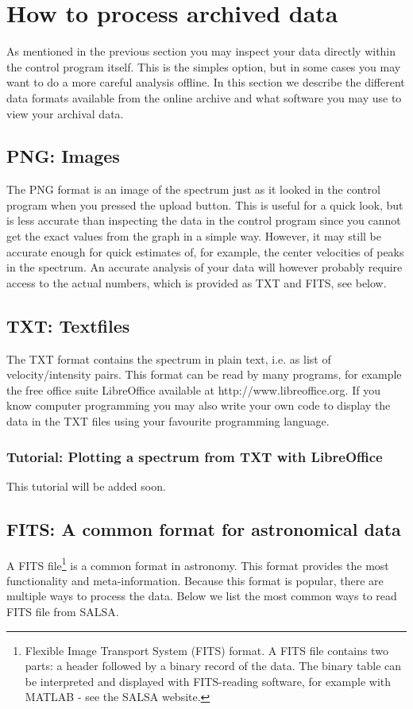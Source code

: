 \section{How to process archived data}
\label{sect:archiveprocess}
As mentioned in the previous section you may inspect your data directly within
the control program itself. This is the simples option, but in some cases you
may want to do a more careful analysis offline. In this section we describe the
different data formats available from the online archive and what software you
may use to view your archival data. 

\subsection{PNG: Images}
The PNG format is an image of the spectrum just as it looked in the control
program when you pressed the upload button. This is useful for a quick look,
but is less accurate than inspecting the data in the control program since you
cannot get the exact values from the graph in a simple way. However, it may
still be accurate enough for quick estimates of, for example, the center
velocities of peaks in the spectrum. An accurate analysis of your data will
however probably require access to the actual numbers, which is provided
as TXT and FITS, see below.

\subsection{TXT: Textfiles}
The TXT format contains the spectrum in plain text, i.e. as list of
velocity/intensity pairs. This format can be read by many programs, for example
the free office suite LibreOffice available at http://www.libreoffice.org.  If
you know computer programming you may also write your own code to display the
data in the TXT files using your favourite programming language.
\subsubsection{Tutorial: Plotting a spectrum from TXT with LibreOffice}
This tutorial will be added soon.

\subsection{FITS: A common format for astronomical data}
A FITS file\footnote{Flexible Image Transport System (FITS) format.  A FITS
file contains two parts: a header followed by a binary record of the data.  The
binary table can be interpreted and displayed with FITS-reading software, for
example with MATLAB - see the SALSA website.} is a common format in astronomy.
This format provides the most functionality and meta-information. Because this 
format is popular, there are multiple ways to process the data. Below we list
the most common ways to read FITS file from SALSA.

